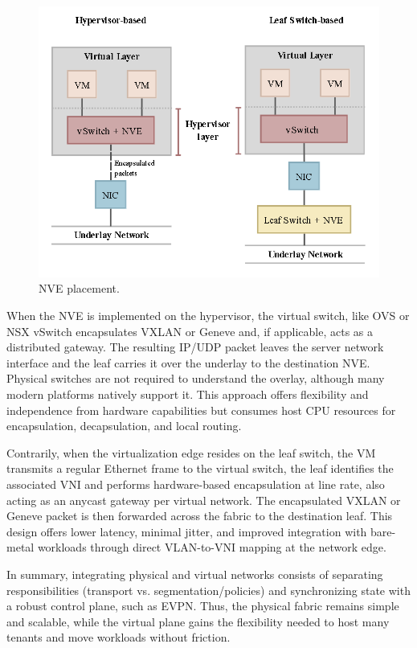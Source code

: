 \begin{figure}
    \vspace{-15pt}
    \centering
    \includegraphics[width=\linewidth]{Figures/NVEplacement.png}
    \caption{NVE placement.}
    \label{NVEplacement}
    \vspace{-5pt}
\end{figure}

When the NVE is implemented on the hypervisor, the virtual switch, like OVS or NSX vSwitch encapsulates VXLAN or Geneve and, if applicable, acts as a distributed gateway. The resulting IP/UDP packet leaves the server network interface and the leaf carries it over the underlay to the destination NVE. Physical switches are not required to understand the overlay, although many modern platforms natively support it. This approach offers flexibility and independence from hardware capabilities but consumes host CPU resources for encapsulation, decapsulation, and local routing.

Contrarily, when the virtualization edge resides on the leaf switch, the VM transmits a regular Ethernet frame to the virtual switch, the leaf identifies the associated VNI and performs hardware-based encapsulation at line rate, also acting as an anycast gateway per virtual network. The encapsulated VXLAN or Geneve packet is then forwarded across the fabric to the destination leaf. This design offers lower latency, minimal jitter, and improved integration with bare-metal workloads through direct VLAN-to-VNI mapping at the network edge.

In summary, integrating physical and virtual networks consists of separating responsibilities (transport vs. segmentation/policies) and synchronizing state with a robust control plane, such as EVPN. Thus, the physical fabric remains simple and scalable, while the virtual plane gains the flexibility needed to host many tenants and move workloads without friction.


